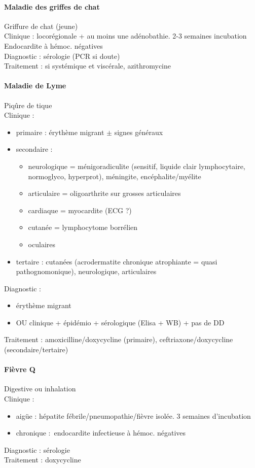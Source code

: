 \paragraph{Maladie des griffes de chat} Griffure de chat (jeune)\\
Clinique : locorégionale + au moins une adénobathie. 2-3 semaines incubation
Endocardite à hémoc. négatives\\
Diagnostic : sérologie (PCR si doute)\\
Traitement : si systémique et viscérale, azithromycine

\paragraph{Maladie de Lyme} Piqûre de tique\\
Clinique :
\begin{itemize}
  \item primaire : érythème migrant $\pm$ signes généraux
  \item secondaire : 
    \begin{itemize}
      \item neurologique = ménigoradiculite (sensitif, liquide clair
        lymphocytaire, normoglyco, hyperprot), méningite, encéphalite/myélite
      \item articulaire = oligoarthrite sur grosses articulaires
      \item cardiaque = myocardite (ECG ?)
      \item cutanée = lymphocytome borrélien
      \item oculaires 
    \end{itemize}
  \item tertaire : cutanées (acrodermatite chronique atrophiante = quasi
    pathognomonique), neurologique, articulaires
\end{itemize}
Diagnostic : 
\begin{itemize}
  \item érythème migrant
  \item OU clinique + épidémio + sérologique (Elisa + WB) + pas de DD
\end{itemize}
Traitement : amoxicilline/doxycycline (primaire), ceftriaxone/doxycycline
(secondaire/tertaire)

\paragraph{Fièvre Q} Digestive ou inhalation\\
Clinique : 
\begin{itemize}
  \item aigüe : hépatite fébrile/pneumopathie/fièvre isolée. 3 semaines d'incubation
  \item chronique : endocardite infectieuse à hémoc. négatives
\end{itemize}
Diagnostic : sérologie\\
Traitement : doxycycline


